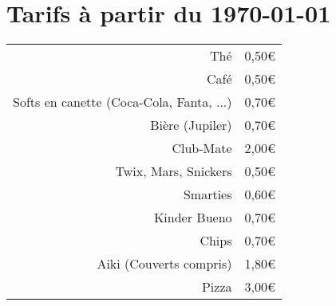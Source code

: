 \documentclass[a4paper,12pt]{article}
\begin{document}
\section*{Tarifs à partir du \today}
\LARGE
\begin{tabular}{ | r | l |}
  \hline
  Thé & 0,50\euro \\
  Café & 0,50\euro \\
  Softs en canette (Coca-Cola, Fanta, ...) & 0,70\euro \\
  Bière (Jupiler) & 0,70\euro \\
  Club-Mate & 2,00\euro \\
  \hline
  Twix, Mars, Snickers & 0,50\euro \\
  Smarties & 0,60\euro \\
  Kinder Bueno & 0,70\euro \\
  Chips & 0,70\euro \\
  \hline
  Aiki (Couverts compris) & 1,80\euro \\
  Pizza & 3,00\euro \\
  \hline
  
  \hline
\end{tabular}
\end{document}
